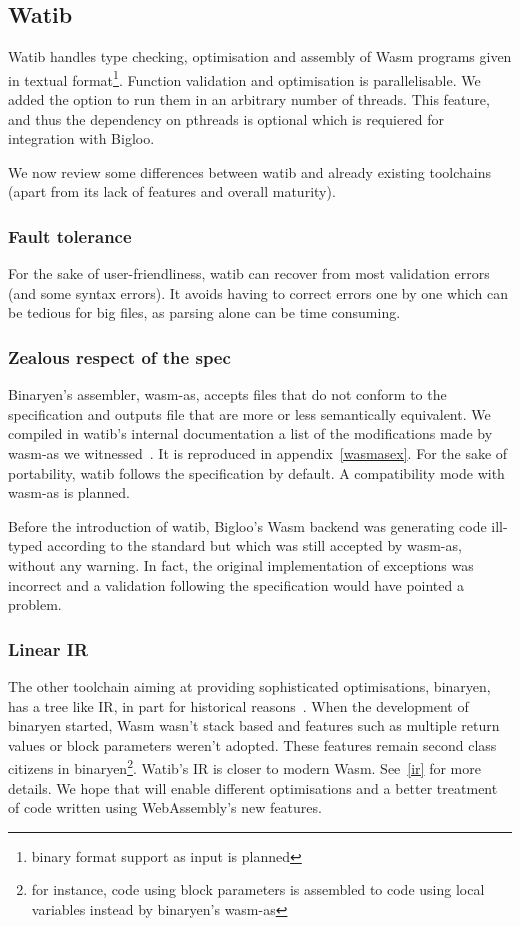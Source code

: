 \documentclass[10pt]{article}
\begin{document}
\subsection{Watib}
Watib handles type checking, optimisation and assembly of Wasm programs given in
textual format\footnote{binary format support as input is planned}. Function
validation and optimisation is parallelisable. We added the option to run them
in an arbitrary number of threads. This feature, and thus the dependency on
pthreads is optional which is requiered for integration with Bigloo.

We now review some differences between watib and already existing toolchains
(apart from its lack of features and overall maturity).
\subsubsection{Fault tolerance}
For the sake of user-friendliness, watib can recover from most validation errors
(and some syntax errors). It avoids having to correct errors one by one which
can be tedious for big files, as parsing alone can be time consuming.

\subsubsection{{Zealous\protect\footnotemark} respect of the spec}
Binaryen's assembler, \textsf{wasm-as}, accepts files that do not conform to the
specification and outputs file that are more or less semantically equivalent. We
compiled in watib's internal documentation a list of the modifications made by
\textsf{wasm-as} we witnessed~\cite{WasmAsExtension}. It is reproduced in
appendix~\ref{wasmasex}. For the sake of portability, watib follows the
specification by default. A compatibility mode with \textsf{wasm-as} is
planned.

Before the introduction of watib, Bigloo's Wasm backend was generating code
ill-typed according to the standard but which was still accepted by
\textsf{wasm-as}, without any warning. In fact, the original implementation of
exceptions was incorrect and a validation following the specification would have
pointed a problem.

\subsubsection{Linear IR}
The other toolchain aiming at providing sophisticated optimisations, binaryen,
has a tree like IR, in part for historical reasons~\cite{BinaryenIR}. When the
development of binaryen started, Wasm wasn't stack based and features such as
multiple return values or block parameters weren't adopted. These features
remain second class citizens in binaryen\footnote{for instance, code using block
parameters is assembled to code using local variables instead by binaryen's
\textsf{wasm-as}}. Watib's IR is closer to modern Wasm. See~\ref{ir} for more
details. We hope that will enable different optimisations and a better treatment
of code written using WebAssembly's new features.
\end{document}
